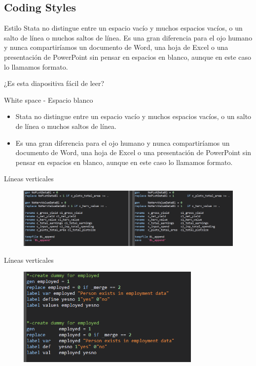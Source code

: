 \documentclass[11pt, aspectratio=169, compress]{beamer}
\begin{document}
\subsection{Coding Styles}
\begin{frame}{Estilo}
	Stata no distingue entre un espacio vacío y muchos espacios vacíos, o un salto de línea o muchos saltos de línea. Es una gran diferencia para el ojo humano y nunca compartiríamos un documento de Word, una hoja de Excel o una presentación de PowerPoint sin pensar en espacios en blanco, aunque en este caso lo llamamos formato.

	\begin{center}
		¿Es esta diapositiva fácil de leer?
	\end{center}
\end{frame}
\begin{frame}{White space - Espacio blanco}
	\begin{itemize}
		\item Stata no distingue entre un espacio vacío y muchos espacios vacíos, o un salto de línea o muchos saltos de línea.

		\item Es una gran diferencia para el ojo humano y nunca compartiríamos un documento de Word, una hoja de Excel o una presentación de PowerPoint sin pensar en espacios en blanco, aunque en este caso lo llamamos formato.
	\end{itemize}
\end{frame}
\begin{frame}{Líneas verticales}
	\begin{figure}[H]
		\centering
		\includegraphics[width=1\textwidth]{code_vertical.png}
	\end{figure}
\end{frame}
\begin{frame}{Líneas verticales}
	\begin{figure}[H]
		\centering
		\includegraphics[width=0.8\textwidth]{code_vertical2.png}
	\end{figure}
\end{frame}
\end{document}
